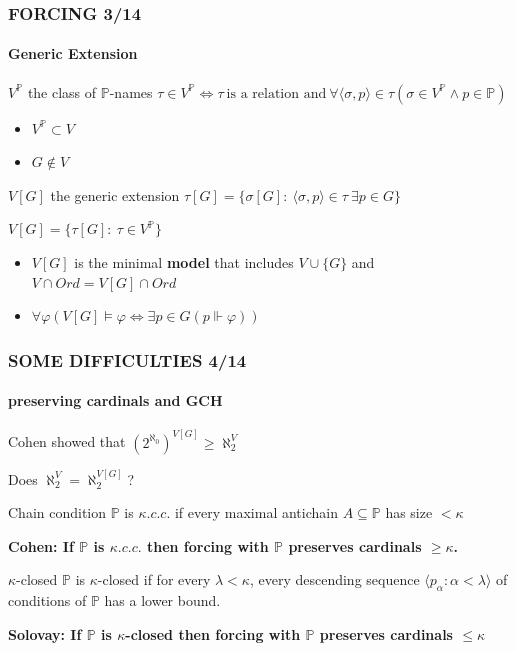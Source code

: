 \documentclass{beamer}
\begin{document}
\begin{frame}
\frametitle{FORCING \hspace{87mm}3/14}
\framesubtitle{Generic Extension}
\begin{block}{$V^{\mathbb{P}}$ the class of $\mathbb{P}$-names}
$\tau \in V^{\mathbb{P}} \iff \tau \ \text{is a relation and} \ \forall \langle \sigma, p \rangle \in \tau (\sigma \in V^{\mathbb{P}} \land p \in \mathbb{P})$
\end{block}
\begin{itemize}
\item $V^{\mathbb{P}} \subset V$
\item $G \notin V$
\end{itemize}
\begin{block}{$V[G]$ the generic extension}
$\tau[G]=\{ \sigma[G] : \ \langle \sigma, p \rangle \in \tau \ \exists p \in G\}$

$V[G]= \{\tau[G] : \ \tau \in V^{\mathbb{P}}\}$
\end{block}
\pause
\begin{itemize}
\item $V[G]$ is the minimal \textbf{{\large model}} that includes $V \cup \{G\}$ and $V \cap Ord = V[G] \cap Ord$
\item $\forall \varphi (V[G] \models \varphi \iff \exists p \in G(p \Vdash \varphi))$
\end{itemize}
\end{frame}
\begin{frame}
\frametitle{SOME DIFFICULTIES \hspace{59mm}4/14}
\framesubtitle{preserving cardinals and GCH}
Cohen showed that $(2^{\aleph_0})^{V[G]} \geq \aleph_2^{V}$

Does $\aleph_2^{V} = \aleph_2^{V[G]}$?
\pause
\begin{block}{Chain condition}
$\mathbb{P}$ is $\kappa.c.c.$ if every maximal antichain $A \subseteq \mathbb{P}$ has size $<\kappa$

\textbf{Cohen: If $\mathbb{P}$ is $\kappa.c.c.$ then forcing with $\mathbb{P}$ preserves cardinals $\geq \kappa$.}
\end{block}
\pause
\begin{block}{$\kappa$-closed}
$\mathbb{P}$ is $\kappa$-closed if for every $\lambda < \kappa$, every descending sequence $\langle p_{\alpha} : \alpha < \lambda \rangle$ of conditions of $\mathbb{P}$ has a lower bound.

\textbf{Solovay: If $\mathbb{P}$ is $\kappa$-closed then forcing with $\mathbb{P}$ preserves cardinals $\leq \kappa$}
\end{block}
\end{frame}
\end{document}
